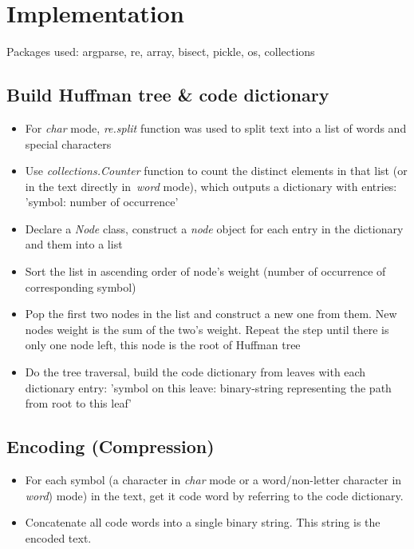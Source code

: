 \documentclass[journal, a4paper]{IEEEtran}
\begin{document}
\section{Implementation}
    \noindent Packages used: argparse, re, array, bisect, pickle, os, collections
    \subsection{Build Huffman tree \& code dictionary}
    \begin{itemize}
        \item For \textit{char} mode, \textit{re.split} function was used to split text into a list of words and special characters
        \item Use \textit{collections.Counter} function to count the distinct elements in that list (or in the text directly in\ \textit{word} mode), which outputs a dictionary with entries: 'symbol: number of occurrence'
        \item Declare a \textit{Node} class, construct a \textit{node} object for each entry in the dictionary and them into a list
        \item Sort the list in ascending order of node's weight (number of occurrence of corresponding symbol)
        \item Pop the first two nodes in the list and construct a new one from them. New nodes weight is the sum of the two's weight. Repeat the step until there is only one node left, this node is the root of Huffman tree
        \item Do the tree traversal, build the code dictionary from leaves with each dictionary entry: 'symbol on this leave: binary-string representing the path from root to this leaf'
    \end{itemize}
    \subsection{Encoding (Compression)}
        \begin{itemize}
            \item For each symbol (a character in \textit{char} mode or a word/non-letter character in \textit{word}) mode) in the text, get it code word by referring to the code dictionary.
            \item Concatenate all code words into a single binary string. This string is the encoded text.
        \end{itemize}
        
\end{document}
